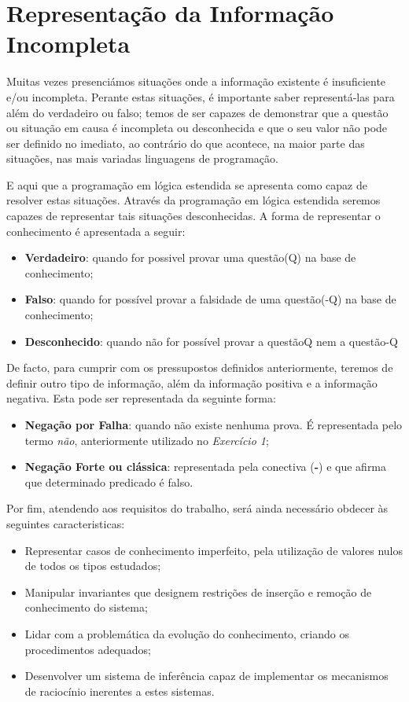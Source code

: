 \section{Representação da Informação Incompleta}


Muitas vezes presenciámos situações onde a informação existente é insuficiente e/ou incompleta. Perante estas situações, é importante saber representá-las para além do verdadeiro ou falso; temos de ser capazes de demonstrar que a questão ou situação em causa é incompleta ou desconhecida e que o seu valor não pode ser definido no imediato, ao contrário do que acontece, na maior parte das situações, nas mais variadas linguagens de programação.

E aqui que a programação em lógica estendida se apresenta como capaz de resolver estas situações. Através da programação em lógica estendida seremos capazes de representar tais situações desconhecidas. A forma de representar o conhecimento é apresentada a seguir:


\begin{itemize}
	\item \textbf{Verdadeiro}: quando for possivel provar uma questão(Q) na base de conhecimento; 
	\item \textbf{Falso}: quando for possível provar a falsidade de uma questão(-Q) na base de conhecimento;
	\item \textbf{Desconhecido}: quando não for possível provar a questãoQ nem a questão-Q
\end{itemize}


De facto, para cumprir com os pressupostos definidos anteriormente, teremos de definir outro tipo de informação, além da informação positiva e a informação negativa. Esta pode ser representada da seguinte forma:


\begin{itemize}
	\item \textbf{Negação por Falha}: quando não existe nenhuma prova. É representada pelo termo \textit{não}, anteriormente utilizado no \textit{Exercício 1};
	\item \textbf{Negação Forte ou clássica}: representada pela conectiva (\textbf{-}) e que afirma que determinado predicado é falso.
\end{itemize}

Por fim, atendendo aos requisitos do trabalho, será ainda necessário obdecer às seguintes caracteristicas:

\begin{itemize}
	\item Representar casos de conhecimento imperfeito, pela utilização de valores nulos de todos os tipos estudados;
	\item Manipular invariantes que designem restrições de inserção e remoção de conhecimento do sistema; 
	\item Lidar com a problemática da evolução do conhecimento, criando os procedimentos adequados;
	\item Desenvolver um sistema de inferência capaz de implementar os mecanismos de raciocínio inerentes a estes sistemas.

\end{itemize}

